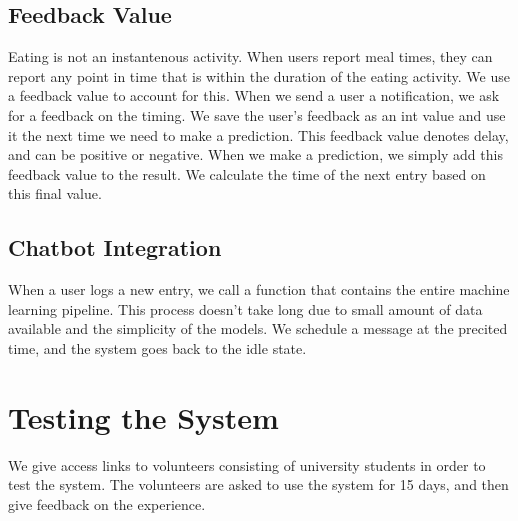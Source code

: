 \subsection{Feedback Value}
Eating is not an instantenous activity.
When users report meal times, they can report any point in time that is within the duration of the eating activity.
We use a feedback value to account for this.
When we send a user a notification, we ask for a feedback on the timing.
We save the user's feedback as an int value and use it the next time we need to make a prediction.
This feedback value denotes delay, and can be positive or negative.
When we make a prediction, we simply add this feedback value to the result.
We calculate the time of the next entry based on this final value.

\subsection{Chatbot Integration}
When a user logs a new entry, we call a function that contains the entire machine learning pipeline.
This process doesn't take long due to small amount of data available and the simplicity of the models.
We schedule a message at the precited time, and the system goes back to the idle state.
\section{Testing the System}
We give access links to volunteers consisting of university students in order to test the system.
The volunteers are asked to use the system for 15 days, and then give feedback on the experience.
